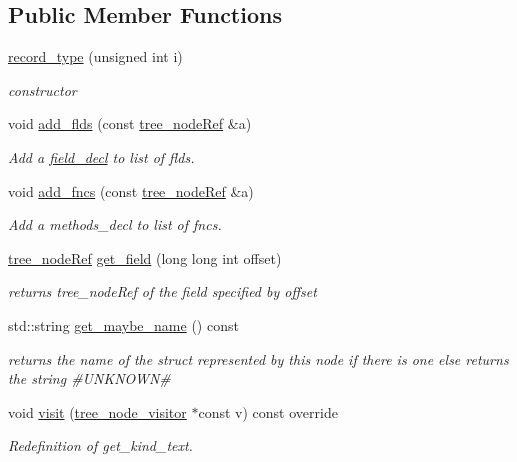 \subsection*{Public Member Functions}
\begin{DoxyCompactItemize}
\item 
\hyperlink{structrecord__type_a7718be6d775dd012658c31e2d17dce32}{record\+\_\+type} (unsigned int i)
\begin{DoxyCompactList}\small\item\em constructor \end{DoxyCompactList}\item 
void \hyperlink{structrecord__type_a75beb4b31852f6243b15e8dc096b3408}{add\+\_\+flds} (const \hyperlink{tree__node_8hpp_a6ee377554d1c4871ad66a337eaa67fd5}{tree\+\_\+node\+Ref} \&a)
\begin{DoxyCompactList}\small\item\em Add a \hyperlink{structfield__decl}{field\+\_\+decl} to list of flds. \end{DoxyCompactList}\item 
void \hyperlink{structrecord__type_ac48913b620192fba7d0a7617ed4cb025}{add\+\_\+fncs} (const \hyperlink{tree__node_8hpp_a6ee377554d1c4871ad66a337eaa67fd5}{tree\+\_\+node\+Ref} \&a)
\begin{DoxyCompactList}\small\item\em Add a methods\+\_\+decl to list of fncs. \end{DoxyCompactList}\item 
\hyperlink{tree__node_8hpp_a6ee377554d1c4871ad66a337eaa67fd5}{tree\+\_\+node\+Ref} \hyperlink{structrecord__type_a5ff87a2eae46bb0cf9981f21987cbde0}{get\+\_\+field} (long long int offset)
\begin{DoxyCompactList}\small\item\em returns tree\+\_\+node\+Ref of the field specified by offset \end{DoxyCompactList}\item 
std\+::string \hyperlink{structrecord__type_abcdb0f23b59997c989a65668950b8d5c}{get\+\_\+maybe\+\_\+name} () const
\begin{DoxyCompactList}\small\item\em returns the name of the struct represented by this node if there is one else returns the string \#U\+N\+K\+N\+O\+WN\# \end{DoxyCompactList}\item 
void \hyperlink{structrecord__type_a4ae646f9bc555d547c8b04a89de4135a}{visit} (\hyperlink{classtree__node__visitor}{tree\+\_\+node\+\_\+visitor} $\ast$const v) const override
\begin{DoxyCompactList}\small\item\em Redefinition of get\+\_\+kind\+\_\+text. \end{DoxyCompactList}\end{DoxyCompactItemize}

